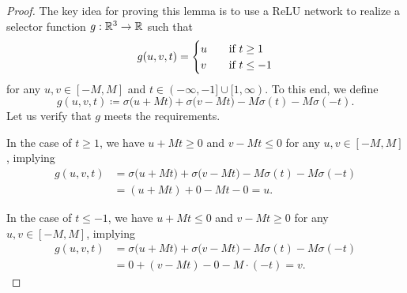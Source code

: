\documentclass[nohyperref]{article}
\theoremstyle{plain}
\theoremstyle{definition}
\theoremstyle{remark}
\begin{document}
\begin{proof}%
	The key idea for proving this lemma is to use a ReLU network to realize a selector function $g:\R^3\to\R$ such that
	\begin{equation*}
		g(u,v,t)=\begin{cases}
			u \quad & \textnormal{if}\  t\ge 1   \\
			v \quad  & \textnormal{if}\  t\le -1
		\end{cases}
	\end{equation*} 
	for any $u,v\in [-M,M]$ and $t\in (-\infty,-1]\cup[1,\infty)$.
	To this end, we define
	\begin{equation}
		\label{eq:def:g:uvt}
		g(u,v,t)\coloneqq\sigma\big(u+Mt\big)+\sigma\big(v-Mt\big)-M\sigma(t)-M\sigma(-t).
	\end{equation}
	Let us verify that $g$ meets the requirements.
	
	In the case of $t\ge 1$, we have $u+Mt\ge 0$ and $v-Mt\le 0$ for any $u,v\in [-M,M]$, implying
	\begin{equation*}
		\begin{split}
			g(u,v,t)
			&=\sigma\big(u+Mt\big)+\sigma\big(v-Mt\big)-M\sigma(t)-M\sigma(-t)\\
			&= (u+Mt) + 0 - Mt -0 =u.
		\end{split}
	\end{equation*}
	
	
	In the case of $t\le -1$, we have $u+Mt\le 0$ and $v-Mt\ge 0$ for any $u,v\in [-M,M]$, implying
	\begin{equation*}
		\begin{split}
			g(u,v,t)
			&=\sigma\big(u+Mt\big)+\sigma\big(v-Mt\big)-M\sigma(t)-M\sigma(-t)\\
			&= 0 +  (v- Mt) -0  - M\cdot(-t)=v.
		\end{split}
	\end{equation*}
	

\end{proof}
\end{document}
